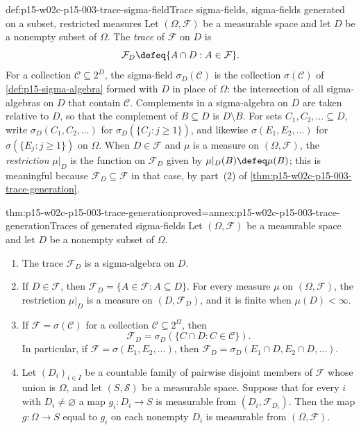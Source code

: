 \begin{hbdefinition}{def:p15-w02c-p15-003-trace-sigma-field}{Trace sigma-fields, sigma-fields generated on a subset, restricted measures}
Let \((\Omega,\mathcal F)\) be a measurable space and let \(D\) be a
nonempty subset of \(\Omega\). The \emph{trace} of \(\mathcal F\) on
\(D\) is
\[
              \mathcal F_D\defeq\{A\cap D:A\in\mathcal F\}.
\]
For a collection \(\mathcal C\subseteq2^D\), the sigma-field
\(\sigma_D(\mathcal C)\) is the collection \(\sigma(\mathcal C)\) of
\cref{def:p15-sigma-algebra} formed with \(D\) in place of
\(\Omega\): the intersection of all sigma-algebras on \(D\) that contain
\(\mathcal C\). Complements in a sigma-algebra on \(D\) are taken
relative to \(D\), so that the complement of \(B\subseteq D\) is
\(D\setminus B\). For sets \(C_1,C_2,\ldots\subseteq D\), write
\(\sigma_D(C_1,C_2,\ldots)\) for \(\sigma_D(\{C_j:j\geq1\})\), and
likewise \(\sigma(E_1,E_2,\ldots)\) for
\(\sigma(\{E_j:j\geq1\})\) on \(\Omega\).
When \(D\in\mathcal F\) and \(\mu\) is a measure on
\((\Omega,\mathcal F)\), the \emph{restriction} \(\mu|_D\) is the
function on \(\mathcal F_D\) given by \(\mu|_D(B)\defeq\mu(B)\); this
is meaningful because \(\mathcal F_D\subseteq\mathcal F\) in that case,
by part~(2) of \cref{thm:p15-w02c-p15-003-trace-generation}.
\end{hbdefinition}

\begin{hbtheorem}{thm:p15-w02c-p15-003-trace-generation}{proved=annex:p15-w02c-p15-003-trace-generation}{Traces of generated sigma-fields}
Let \((\Omega,\mathcal F)\) be a measurable space and let \(D\) be a
nonempty subset of \(\Omega\).
\begin{enumerate}
\item The trace \(\mathcal F_D\) is a sigma-algebra on \(D\).
\item If \(D\in\mathcal F\), then
      \(\mathcal F_D=\{A\in\mathcal F:A\subseteq D\}\). For every measure
      \(\mu\) on \((\Omega,\mathcal F)\), the restriction \(\mu|_D\) is a
      measure on \((D,\mathcal F_D)\), and it is finite when
      \(\mu(D)<\infty\).
\item If \(\mathcal F=\sigma(\mathcal C)\) for a collection
      \(\mathcal C\subseteq2^\Omega\), then
      \[
           \mathcal F_D=\sigma_D(\{C\cap D:C\in\mathcal C\}).
      \]
      In particular, if \(\mathcal F=\sigma(E_1,E_2,\ldots)\), then
      \(\mathcal F_D=\sigma_D(E_1\cap D,E_2\cap D,\ldots)\).
\item Let \((D_i)_{i\in I}\) be a countable family of pairwise disjoint
      members of \(\mathcal F\) whose union is \(\Omega\), and let
      \((S,\mathcal S)\) be a measurable space. Suppose that for every
      \(i\) with \(D_i\neq\varnothing\) a map \(g_i:D_i\to S\) is
      measurable from \((D_i,\mathcal F_{D_i})\). Then the map
      \(g:\Omega\to S\) equal to \(g_i\) on each nonempty \(D_i\) is
      measurable from \((\Omega,\mathcal F)\).
\end{enumerate}
\end{hbtheorem}

